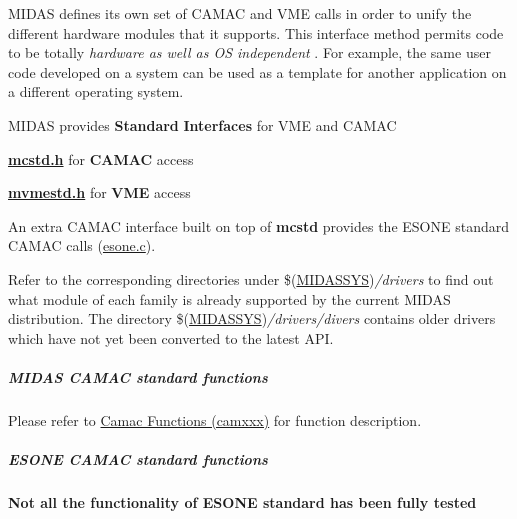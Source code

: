 \par
 \label{FE_camac_vme_function_calls_idx_hardware_standard_interface}
\hypertarget{FE_camac_vme_function_calls_idx_hardware_standard_interface}{}
 MIDAS defines its own set of CAMAC and VME calls in order to unify the different hardware modules that it supports. This interface method permits code to be totally {\itshape  hardware as well as OS independent \/}. For example, the same user code developed on a system can be used as a template for another application on a different operating system.

MIDAS provides {\bfseries Standard} {\bfseries Interfaces} for VME and CAMAC
\begin{DoxyItemize}
\item {\bfseries \hyperlink{mcstd_8h}{mcstd.h}} for {\bfseries CAMAC} access
\item {\bfseries \hyperlink{mvmestd_8h}{mvmestd.h}} for {\bfseries VME} access
\end{DoxyItemize}

An extra CAMAC interface built on top of {\bfseries mcstd} provides the ESONE standard CAMAC calls (\hyperlink{esone_8c}{esone.c}).

Refer to the corresponding directories under \$(\hyperlink{BuildingOptions_BO_MIDASSYS}{MIDASSYS}){\itshape /drivers\/} to find out what module of each family is already supported by the current MIDAS distribution. The directory \$(\hyperlink{BuildingOptions_BO_MIDASSYS}{MIDASSYS}){\itshape /drivers/divers\/} contains older drivers which have not yet been converted to the latest API.

\label{FE_camac_vme_function_calls_idx_hardware_standard_interface_CAMAC}
\hypertarget{FE_camac_vme_function_calls_idx_hardware_standard_interface_CAMAC}{}
 

 \hypertarget{FE_camac_vme_function_calls_FE_Midas_CAMAC_standard_functions}{}\subparagraph{MIDAS CAMAC standard functions}\label{FE_camac_vme_function_calls_FE_Midas_CAMAC_standard_functions}
Please refer to \hyperlink{group__mcstdfunctionh}{Camac Functions (camxxx)} for function description.

\label{FE_camac_vme_function_calls_idx_hardware_CAMAC_functions_ESONE}
\hypertarget{FE_camac_vme_function_calls_idx_hardware_CAMAC_functions_ESONE}{}
 

 \hypertarget{FE_camac_vme_function_calls_FE_ESONE_CAMAC_standard_functions}{}\subparagraph{ESONE CAMAC standard functions}\label{FE_camac_vme_function_calls_FE_ESONE_CAMAC_standard_functions}
{\bfseries Not all the functionality of ESONE standard has been fully tested}

